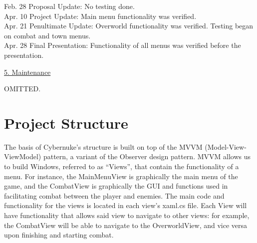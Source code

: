 \documentclass[10pt,conference,onecolumn,compsoc]{IEEEtran}
\begin{document}
Feb. 28 Proposal Update: No testing done.\\

Apr. 10 Project Update: Main menu functionality was verified.\\

Apr. 21 Penultimate Update: Overworld functionality was verified. Testing began on combat and town menus.\\

Apr. 28 Final Presentation: Functionality of all menus was verified before the presentation.

\vspace{5px}
\underline{5. Maintenance}
\vspace{5px}

OMITTED.


\section{Project Structure}

The basis of Cybernuke's structure is built on top of the MVVM (Model-View-ViewModel) pattern, a variant of the Observer design pattern. MVVM allows us to build Windows, referred to as “Views”, that contain the functionality of a menu. For instance, the MainMenuView is graphically the main menu of the game, and the CombatView is graphically the GUI and functions used in facilitating combat between the player and enemies. The main code and functionality for the views is located in each view's xaml.cs file. Each View will have functionality that allows said view to navigate to other views: for example, the CombatView will be able to navigate to the OverworldView, and vice versa upon finishing and starting combat.
\end{document}
